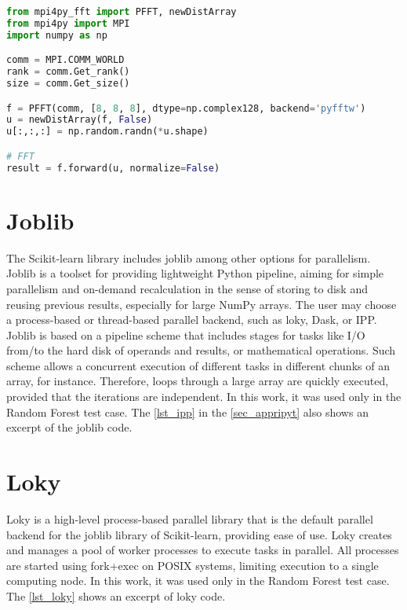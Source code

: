 \begin{lstlisting}[float=htb, language={Python}, label={lst_mpifft}, caption={Excerpt of mpi4py-fft code.}]
from mpi4py_fft import PFFT, newDistArray
from mpi4py import MPI
import numpy as np

comm = MPI.COMM_WORLD
rank = comm.Get_rank()
size = comm.Get_size()

f = PFFT(comm, [8, 8, 8], dtype=np.complex128, backend='pyfftw')
u = newDistArray(f, False)
u[:,:,:] = np.random.randn(*u.shape)

# FFT
result = f.forward(u, normalize=False)
\end{lstlisting}

%
%
%
\section{Joblib}
\label{sec_apprjlib}

The Scikit-learn library includes joblib \cite {Faouzi2020} among other options for parallelism. Joblib is a toolset for providing lightweight Python pipeline, aiming for simple parallelism and on-demand recalculation in the sense of storing to disk and reusing previous results, especially for large NumPy arrays. The user may choose a process-based or thread-based parallel backend, such as loky, Dask, or IPP. Joblib is based on a pipeline scheme that includes stages for tasks like I/O from/to the hard disk of operands and results, or mathematical operations. Such scheme allows a concurrent execution of different tasks in different chunks of an array, for instance. Therefore, loops through a large array are quickly executed, provided that the iterations are independent. In this work, it was used only in the Random Forest test case. The \autoref {lst_ipp} in the \autoref {sec_appripyt} also shows an excerpt of the joblib code.

%
%
%
\section{Loky}
\label{sec_apprloky}

Loky \cite {Kolesnikov2020} is a high-level process-based parallel library that is the default parallel backend for the joblib library of Scikit-learn, providing ease of use. Loky creates and manages a pool of worker processes to execute tasks in parallel. All processes are started using fork+exec on POSIX systems, limiting execution to a single computing node. In this work, it was used only in the Random Forest test case. The \autoref {lst_loky} shows an excerpt of loky code.


